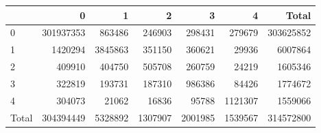 \begin{tabular}{lrrrrrr}
\toprule
 & 0 & 1 & 2 & 3 & 4 & Total \\
\midrule
0 & 301937353 & 863486 & 246903 & 298431 & 279679 & 303625852 \\
1 & 1420294 & 3845863 & 351150 & 360621 & 29936 & 6007864 \\
2 & 409910 & 404750 & 505708 & 260759 & 24219 & 1605346 \\
3 & 322819 & 193731 & 187310 & 986386 & 84426 & 1774672 \\
4 & 304073 & 21062 & 16836 & 95788 & 1121307 & 1559066 \\
Total & 304394449 & 5328892 & 1307907 & 2001985 & 1539567 & 314572800 \\
\bottomrule
\end{tabular}
